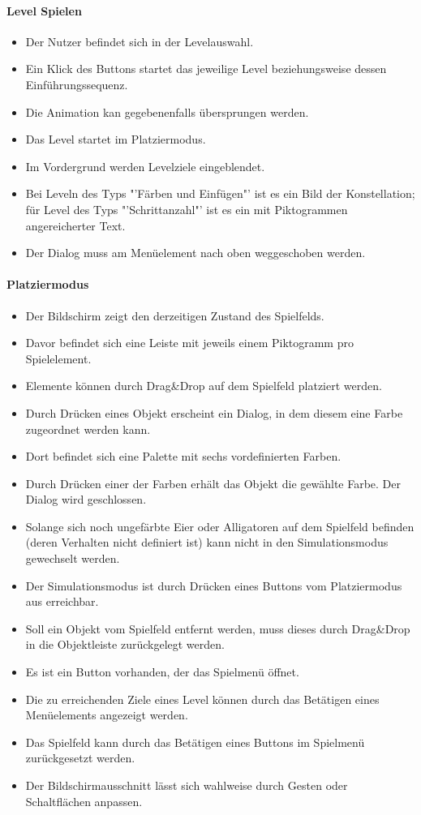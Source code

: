 \paragraph{Level Spielen}
\begin{itemize}
\item Der Nutzer befindet sich in der Levelauswahl.
\item Ein Klick des Buttons startet das jeweilige Level beziehungsweise dessen Einführungssequenz. 
\item Die Animation kan gegebenenfalls übersprungen werden.
\item Das Level startet im Platziermodus.
\item Im Vordergrund werden Levelziele eingeblendet.
\item Bei Leveln des Typs "'Färben und Einfügen"'  ist es ein Bild der Konstellation; für Level des Typs "'Schrittanzahl"' ist es ein mit Piktogrammen angereicherter Text.
\item Der Dialog muss am Menüelement nach oben weggeschoben werden. 
\end{itemize}


\paragraph{Platziermodus}
\begin{itemize}  
\item Der Bildschirm zeigt den derzeitigen Zustand des Spielfelds.
\item Davor befindet sich eine Leiste mit jeweils einem Piktogramm pro Spielelement.
\item Elemente können durch Drag\&Drop auf dem Spielfeld platziert werden. 
\item  Durch Drücken eines Objekt erscheint 
ein Dialog, in dem diesem eine Farbe zugeordnet werden kann.
\item Dort befindet sich eine Palette mit sechs vordefinierten Farben.
\item Durch Drücken einer der Farben erhält das Objekt die gewählte Farbe. Der Dialog wird geschlossen.
\item Solange sich noch ungefärbte Eier oder Alligatoren auf dem Spielfeld befinden (deren Verhalten
nicht definiert ist) kann nicht in den Simulationsmodus gewechselt werden.
\item Der Simulationsmodus ist durch Drücken eines Buttons vom Platziermodus
aus erreichbar.
\item Soll ein Objekt vom Spielfeld entfernt werden, muss dieses durch Drag\&Drop
in die Objektleiste zurückgelegt werden.
\item Es ist ein Button vorhanden, der das Spielmenü öffnet.
\item Die zu erreichenden Ziele eines Level können durch das Betätigen eines Menüelements angezeigt werden.
\item Das Spielfeld kann durch das Betätigen eines Buttons im Spielmenü zurückgesetzt werden.
\item Der Bildschirmausschnitt lässt sich wahlweise durch Gesten oder Schaltflächen anpassen.
\end{itemize}

